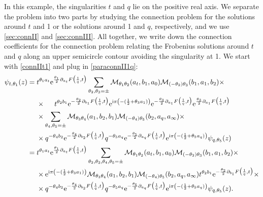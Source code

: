 \documentclass[11pt]{article}
\numberwithin{equation}{section}
\newcommand{\ri}{{\rm i}}
\newcommand{\E}{{\mathrm e}}
\begin{document}
In this example, the singularities $t$ and $q$ lie on the positive real axis. We separate the problem into two parts by studying the connection problem for the solutions around $t$ and 1 or the solutions around 1 and $q$, respectively, and we use \autoref{sec:connII} and \autoref{sec:connIII}.  All together, we write down the connection coefficients for the connection problem relating the Frobenius solutions around $t$ and $q$ along an upper semicircle contour avoiding the singularity at 1. We start with \eqref{connIIt1} and plug in \eqref{paraconnII1q}:
\begin{equation}
\begin{aligned}
\psi_{t,\theta_1}(z)&=t^{\theta_1 a_t}\E^{\frac{\theta_1}{2}\partial_{a_t}F\big({1\over q},t\big)}\sum_{\theta_2,\theta_3=\pm}\mathcal{M}_{\theta_1\theta_2}(a_t,b_1,a_0)\mathcal{M}_{(-\theta_2)\theta_3}(b_1,a_1,b_2)\times\\
&\quad\ \times\quad\ t^{\theta_2 b_1}\E^{-\frac{\theta_2}{2}\partial_{b_1}F\big({1\over q},t\big)}\E^{\ri\pi\left(-(\frac1 2+\theta_3 a_1)\right)}\E^{-\frac{\theta_3}{2}\partial_{a_1}F\big({1\over q},t\big)}\E^{\frac{\theta_3}{2}\partial_{a_1}F\big({1\over q},t\big)}\\
&\quad\ \times\sum_{\theta_4,\theta_5=\pm}\mathcal{M}_{\theta_3\theta_4}(a_1,b_2,b_1)\mathcal{M}_{(-\theta_4)\theta_5}(b_2,a_q,a_\infty)\times\\
&\quad\ \times q^{-\theta_4 b_2}\E^{-\frac{\theta_4}{2}\partial_{b_2}F\big({1\over q},t\big)}q^{-\theta_5 a_q}\E^{-\frac{\theta_5}{2}\partial_{a_q}F\big({1\over q},t\big)}\E^{\ri\pi\left(-(\frac1 2 +\theta_5 a_q)\right)}\psi_{q,\theta_5}(z)\\
&=t^{\theta_1 a_t}\E^{\frac{\theta_1}{2}\partial_{a_t}F\big({1\over q},t\big)}\sum_{\theta_2,\theta_3,\theta_4,\theta_5=\pm}\mathcal{M}_{\theta_1\theta_2}(a_t,b_1,a_0)\mathcal{M}_{(-\theta_2)\theta_3}(b_1,a_1,b_2)\times\\
&\quad\ \times\E^{\ri\pi\left(-(\frac1 2+\theta_3 a_1)\right)}\mathcal{M}_{\theta_3\theta_4}(a_1,b_2,b_1)\mathcal{M}_{(-\theta_4)\theta_5}(b_2,a_q,a_\infty) t^{\theta_2 b_1}\E^{-\frac{\theta_2}{2}\partial_{b_1}F\big({1\over q},t\big)}\times\\\
&\quad\ \times q^{-\theta_4 b_2}\E^{-\frac{\theta_4}{2}\partial_{b_2}F\big({1\over q},t\big)}q^{-\theta_5 a_q}\E^{-\frac{\theta_5}{2}\partial_{a_q}F\big({1\over q},t\big)}\E^{\ri\pi\left(-(\frac1 2 +\theta_5 a_q)\right)}\psi_{q,\theta_5}(z).
\end{aligned}
\end{equation}
\end{document}
